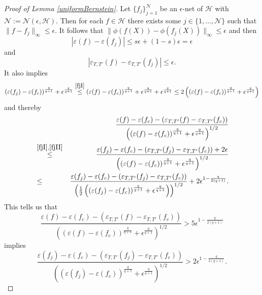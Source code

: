 \documentclass{article}
\begin{document}
\begin{proof}[Proof of Lemma \ref{uniformBernstein}]
Let $\{f_j\}_{j=1}^{\mathcal N}$ be an $\epsilon$-net of ${\mathcal H}$ with ${\mathcal N}:={\mathcal N}\left(\epsilon, {\mathcal H}\right)$. Then for each $f\in {\mathcal H}$ there exists some $j\in \{1, \ldots, {\mathcal N}\}$ such that $\|f-f_j\|_\infty \leq \epsilon$. It follows that $\|\phi(f(X)) - \phi(f_j(X))\|_\infty \leq \epsilon$ and then 
\begin{equation}\label{fjI}
  \left|\varepsilon (f) - \varepsilon (f_j)\right| \leq s \epsilon + (1-s) \epsilon =\epsilon   
\end{equation} 
and 
\begin{equation}\label{fjII}
\left|\varepsilon_{T, T'} (f) - \varepsilon_{T, T'} (f_j)\right| \leq \epsilon.   
\end{equation}  
It also implies 
$$ \left(\varepsilon (f_j) - \varepsilon (f_c)\right)^{\frac{q}{q+1}} + \epsilon^{\frac{q}{q+1}} \stackrel{\eqref{fjI}}{\leq} \left(\varepsilon (f) - \varepsilon (f_c)\right)^{\frac{q}{q+1}} + \epsilon^{\frac{q}{q+1}} +  \epsilon^{\frac{q}{q+1}} \leq 2\left(\left(\varepsilon (f) - \varepsilon (f_c)\right)^{\frac{q}{q+1}} + \epsilon^{\frac{q}{q+1}}\right)  $$
and thereby 
\begin{eqnarray*} 
&& \frac{\varepsilon (f) - \varepsilon (f_c) - \left(\varepsilon_{T, T'} (f) - \varepsilon_{T, T'} (f_c)\right)}{\left(\left(\varepsilon (f) - \varepsilon (f_c)\right)^{\frac{q}{q+1}} + \epsilon^{\frac{q}{q+1}}\right)^{1/2}} \\
&\stackrel{\eqref{fjI}, \eqref{fjII}}{\leq}& \frac{\varepsilon (f_j) - \varepsilon (f_c) - \left(\varepsilon_{T, T'} (f_j) - \varepsilon_{T, T'} (f_c)\right) + 2 \epsilon}{\left(\left(\varepsilon (f) - \varepsilon (f_c)\right)^{\frac{q}{q+1}} + \epsilon^{\frac{q}{q+1}}\right)^{1/2}} \\
&\leq& \frac{\varepsilon (f_j) - \varepsilon (f_c) - \left(\varepsilon_{T, T'} (f_j) - \varepsilon_{T, T'} (f_c)\right)}{\left(\frac{1}{2}\left(\left(\varepsilon (f_j) - \varepsilon (f_c)\right)^{\frac{q}{q+1}} + \epsilon^{\frac{q}{q+1}}\right)\right)^{1/2}}  + 2 \epsilon^{1-{\frac{q}{2(q+1)}}}. 
\end{eqnarray*}
This tells us that 
$$ \frac{\varepsilon (f) - \varepsilon (f_c) - \left(\varepsilon_{T, T'} (f) - \varepsilon_{T, T'} (f_c)\right)}{\left(\left(\varepsilon (f) - \varepsilon (f_c)\right)^{\frac{q}{q+1}} + \epsilon^{\frac{q}{q+1}}\right)^{1/2}} > 5 \epsilon^{1-{\frac{q}{2(q+1)}}} $$
implies 
$$  \frac{\varepsilon (f_j) - \varepsilon (f_c) - \left(\varepsilon_{T, T'} (f_j) - \varepsilon_{T, T'} (f_c)\right)}{\left(\left(\varepsilon (f_j) - \varepsilon (f_c)\right)^{\frac{q}{q+1}} + \epsilon^{\frac{q}{q+1}}\right)^{1/2}}  >2 \epsilon^{1-{\frac{q}{2(q+1)}}}. $$

\end{proof}
\end{document}

